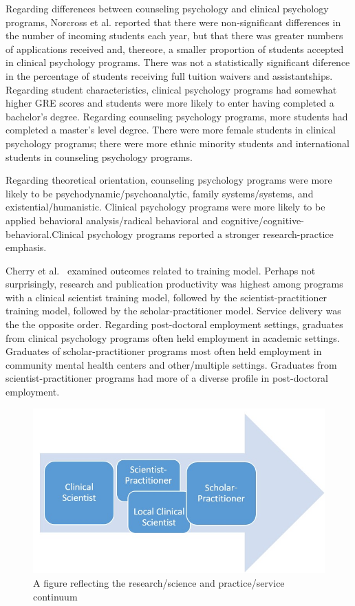 \documentclass[
  english,
]{book}
\begin{document}
Regarding differences between counseling psychology and clinical psychology programs, Norcross et al.\citeyearpar{norcross_doctoral_2020} reported that there were non-significant differences in the number of incoming students each year, but that there was greater numbers of applications received and, thereore, a smaller proportion of students accepted in clinical psychology programs. There was not a statistically significant diference in the percentage of students receiving full tuition waivers and assistantships. Regarding student characteristics, clinical psychology programs had somewhat higher GRE scores and students were more likely to enter having completed a bachelor's degree. Regarding counseling psychology programs, more students had completed a master's level degree. There were more female students in clinical psychology programs; there were more ethnic minority students and international students in counseling psychology programs.

Regarding theoretical orientation, counseling psychology programs were more likely to be psychodynamic/psychoanalytic, family systems/systems, and existential/humanistic. Clinical psychology programs were more likely to be applied behavioral analysis/radical behavioral and cognitive/cognitive-behavioral.Clinical psychology programs reported a stronger research-practice emphasis.

Cherry et al.~\citeyearpar{cherry_examination_2000} examined outcomes related to training model. Perhaps not surprisingly, research and publication productivity was highest among programs with a clinical scientist training model, followed by the scientist-practitioner training model, followed by the scholar-practitioner model. Service delivery was the the opposite order. Regarding post-doctoral employment settings, graduates from clinical psychology programs often held employment in academic settings. Graduates of scholar-practitioner programs most often held employment in community mental health centers and other/multiple settings. Graduates from scientist-practitioner programs had more of a diverse profile in post-doctoral employment.

\begin{figure}
\centering
\includegraphics{images/Tmodels/SciencePracticeContinuum.jpg}
\caption{A figure reflecting the research/science and practice/service continuum}
\end{figure}
\end{document}
